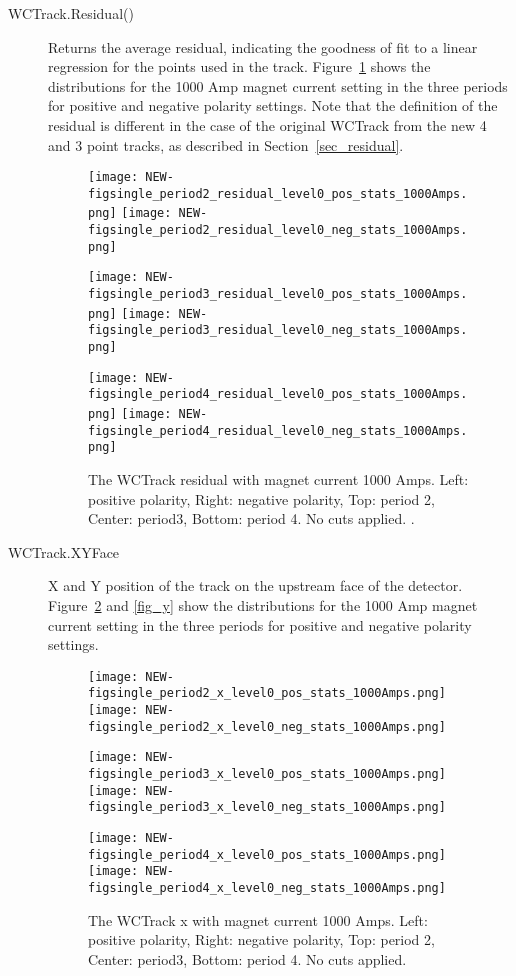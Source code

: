 \begin{description}
 \item[WCTrack.Residual()] {   
   Returns the average residual, indicating the goodness of fit to a linear regression for the points used in the track. Figure~\ref{fig_residual} shows the  distributions for the 1000 Amp magnet current setting in the three periods for positive and negative polarity settings. Note that the definition of the residual is different in the case of the original WCTrack from the new 4 and 3 point tracks, as described in Section~\ref{sec_residual}.
         \begin{figure}[h]
           \centering   
            	\texttt{[image: NEW-figsingle\_period2\_residual\_level0\_pos\_stats\_1000Amps.png]}
	 \texttt{[image: NEW-figsingle\_period2\_residual\_level0\_neg\_stats\_1000Amps.png]}
	 
   	\texttt{[image: NEW-figsingle\_period3\_residual\_level0\_pos\_stats\_1000Amps.png]}
	 \texttt{[image: NEW-figsingle\_period3\_residual\_level0\_neg\_stats\_1000Amps.png]}
	 
 	\texttt{[image: NEW-figsingle\_period4\_residual\_level0\_pos\_stats\_1000Amps.png]}
	 \texttt{[image: NEW-figsingle\_period4\_residual\_level0\_neg\_stats\_1000Amps.png]}
   \caption[short]{The WCTrack residual with magnet current 1000 Amps. Left: positive polarity, Right: negative polarity, Top: period 2, Center: period3,  Bottom: period 4. No cuts applied. .}
   \label{fig_residual}
  \end{figure}
 }
   
\item[WCTrack.XYFace]{
  X and Y position of the track on the upstream face of the detector. Figure~\ref{fig_x} and  \ref{fig_y} show the distributions for the 1000 Amp magnet current setting in the three periods for positive and negative polarity settings.
      \begin{figure}[h]
        \centering   
         	\texttt{[image: NEW-figsingle\_period2\_x\_level0\_pos\_stats\_1000Amps.png]}
	 \texttt{[image: NEW-figsingle\_period2\_x\_level0\_neg\_stats\_1000Amps.png]}
	 
   	\texttt{[image: NEW-figsingle\_period3\_x\_level0\_pos\_stats\_1000Amps.png]}
	 \texttt{[image: NEW-figsingle\_period3\_x\_level0\_neg\_stats\_1000Amps.png]}
	 
 	\texttt{[image: NEW-figsingle\_period4\_x\_level0\_pos\_stats\_1000Amps.png]}
	 \texttt{[image: NEW-figsingle\_period4\_x\_level0\_neg\_stats\_1000Amps.png]}
   \caption[short]{The WCTrack x with magnet current 1000 Amps. Left: positive polarity, Right: negative polarity, Top: period 2, Center: period3,  Bottom: period 4. No cuts applied.}
   \label{fig_x}
  \end{figure}
  
}
\end{description}
